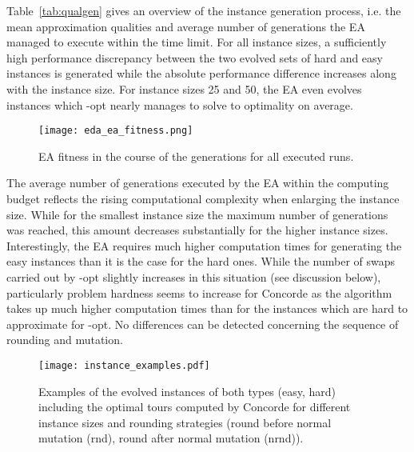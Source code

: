 \documentclass{article}
\begin{document}
Table~\ref{tab:qualgen} gives an overview of the instance generation
process, i.e. the mean approximation qualities and average number of
generations the EA managed to execute within the time limit. For all
instance sizes, a sufficiently high performance discrepancy between
the two evolved sets of hard and easy instances is generated while the
absolute performance difference increases along with the instance
size. For instance sizes 25 and 50, the EA even evolves instances
which -opt nearly manages to solve to optimality on average.

\begin{figure}
  \centering
  \texttt{[image: eda\_ea\_fitness.png]}
  \caption{EA fitness in the course of the generations for all
    executed runs.}
  \label{fig:eafitness}
\end{figure}

The average number of generations executed by the EA within the
computing budget reflects the rising computational complexity when
enlarging the instance size. While for the smallest instance size the
maximum number of generations was reached, this amount decreases
substantially for the higher instance sizes. Interestingly, the EA
requires much higher computation times for generating the easy
instances than it is the case for the hard ones. While the number of
swaps carried out by -opt slightly increases in this situation (see
discussion below), particularly problem hardness seems to increase for
Concorde as the algorithm takes up much higher computation times than
for the instances which are hard to approximate for -opt. No
differences can be detected concerning the sequence of rounding and
mutation.

\begin{figure}
  \centering
  \texttt{[image: instance\_examples.pdf]}
  \caption{Examples of the evolved instances of both types (easy,
    hard) including the optimal tours computed by Concorde for
    different instance sizes and rounding strategies (round before
    normal mutation (rnd), round after normal mutation (nrnd)).}
  \label{fig:extour}
\end{figure}
\end{document}
